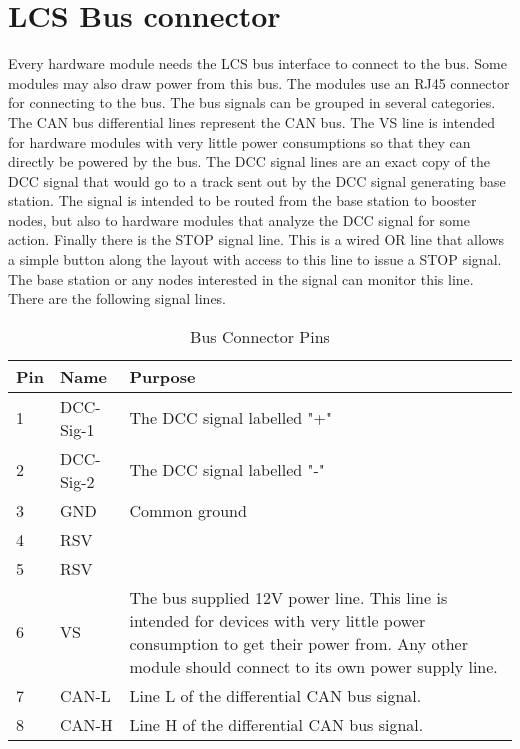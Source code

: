 \section{LCS Bus connector}

Every hardware module needs the LCS bus interface to connect to the bus. Some modules may also draw power from this bus. The modules use an RJ45 connector for connecting to the bus. The bus signals can be grouped in several categories. The CAN bus differential lines represent the CAN bus. The VS line is intended for hardware modules with very little power consumptions so that they can directly be powered by the bus. The DCC signal lines are an exact copy of the DCC signal that would go to a track sent out by the DCC signal generating base station. The signal is intended to be routed from the base station to booster nodes, but also to hardware modules that analyze the DCC signal for some action. Finally there is the STOP signal line. This is a wired OR line that allows a simple button along the layout with access to this line to issue a STOP signal. The base station or any nodes interested in the signal can monitor this line. There are the following signal lines.

\begin{table}[h!]
    \begin{center}
        \caption{Bus Connector Pins}
        \begin{tabular}{|l|l|p{}|}
            \toprule
            \textbf{Pin} & \textbf{Name} & \textbf{Purpose} \\
            \midrule
            1 & DCC-Sig-1 & The DCC signal labelled "+" \\
            \midrule
            2 & DCC-Sig-2 & The DCC signal labelled "-" \\
            \midrule
            3 & GND &  Common ground \\
            \midrule
            4 & RSV &  \\
            \midrule
            5 & RSV &  \\
            \midrule
            6 & VS & The bus supplied 12V power line. This line is intended for devices with very little power consumption to get their power from. Any other module should connect to its own power supply line. \\
            \midrule
            7 & CAN-L &  Line L of the differential CAN bus signal. \\
            \midrule
            8 & CAN-H &  Line H of the differential CAN bus signal. \\
            \bottomrule
        \end{tabular}
    \end{center}
\end{table}

